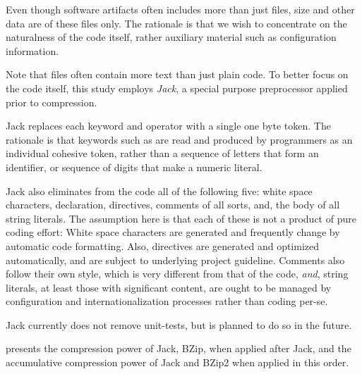 \begin{description}
\begin{description}
Even though software artifacts often includes more than just  files,
size and other data are of these files only. The rationale is that we wish to
concentrate on the naturalness of the \Java code itself, rather auxiliary
material such as configuration information.

Note that  files often contain more text than just plain code.  To
better focus on the code itself, this study employs \emph{Jack}, a special
purpose \Java preprocessor applied prior to compression. 

Jack replaces each keyword and operator with a single one byte token. The
rationale is that keywords such as  are read and produced by
programmers as an individual cohesive token, rather than a sequence of letters
that form an identifier, or sequence of digits that make a numeric literal.

Jack also eliminates from the \Java code all of the following five: white space
characters,  declaration,  directives, comments of all
sorts, and, the body of all string literals. The assumption here is that each
of these is not a product of pure coding effort: White space characters are
generated and frequently change by automatic code formatting. Also, 
directives are generated and optimized automatically, and are subject to
underlying project guideline. Comments also follow their own style, which is
very different from that of the code, \emph{and}, string literals, at least
those with significant content, are ought to be managed by configuration and
internationalization processes rather than coding per-se.

Jack currently does not remove unit-tests, but is planned to do so in the
future.

 presents the compression power of Jack, BZip, when
applied after Jack, and the accumulative compression power of Jack and BZip2
when applied in this order.


\end{description}
\end{description}

